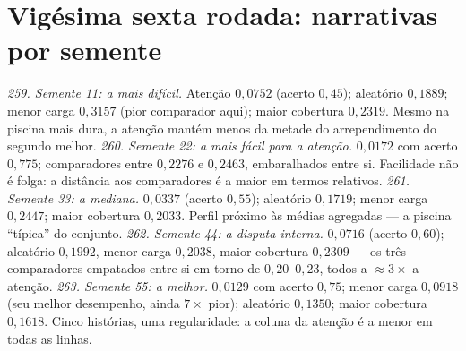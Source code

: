 \section{Vigésima sexta rodada: narrativas por semente}
\textit{259. Semente 11: a mais difícil.} Atenção $0{,}0752$ (acerto $0{,}45$); aleatório $0{,}1889$; menor carga $0{,}3157$ (pior comparador aqui); maior cobertura $0{,}2319$. Mesmo na piscina mais dura, a atenção mantém menos da metade do arrependimento do segundo melhor.
\textit{260. Semente 22: a mais fácil para a atenção.} $0{,}0172$ com acerto $0{,}775$; comparadores entre $0{,}2276$ e $0{,}2463$, embaralhados entre si. Facilidade não é folga: a distância aos comparadores é a maior em termos relativos.
\textit{261. Semente 33: a mediana.} $0{,}0337$ (acerto $0{,}55$); aleatório $0{,}1719$; menor carga $0{,}2447$; maior cobertura $0{,}2033$. Perfil próximo às médias agregadas --- a piscina ``típica'' do conjunto.
\textit{262. Semente 44: a disputa interna.} $0{,}0716$ (acerto $0{,}60$); aleatório $0{,}1992$, menor carga $0{,}2038$, maior cobertura $0{,}2309$ --- os três comparadores empatados entre si em torno de $0{,}20$--$0{,}23$, todos a $\approx3\times$ a atenção.
\textit{263. Semente 55: a melhor.} $0{,}0129$ com acerto $0{,}75$; menor carga $0{,}0918$ (seu melhor desempenho, ainda $7\times$ pior); aleatório $0{,}1350$; maior cobertura $0{,}1618$. Cinco histórias, uma regularidade: a coluna da atenção é a menor em todas as linhas.
